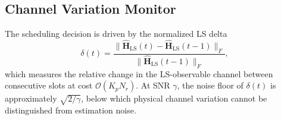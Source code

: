 \subsection{Channel Variation Monitor}

The scheduling decision is driven by the normalized LS delta
%
\begin{equation}\label{eq:delta}
  \delta(t) = \frac{\bigl\|\hat{\mathbf{H}}_{\mathrm{LS}}(t) - \hat{\mathbf{H}}_{\mathrm{LS}}(t{-}1)\bigr\|_F}
              {\bigl\|\hat{\mathbf{H}}_{\mathrm{LS}}(t{-}1)\bigr\|_F},
\end{equation}
%
which measures the relative change in the LS-observable channel between consecutive slots at cost $\mathcal{O}(K_p N_r)$.
At SNR $\gamma$, the noise floor of $\delta(t)$ is approximately $\sqrt{2/\gamma}$, below which physical channel variation cannot be distinguished from estimation noise.
